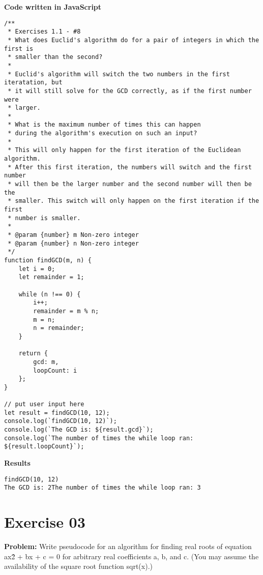 \documentclass[paper=a4, fontsize=11pt]{scrartcl} %
\numberwithin{equation}{section} %
\numberwithin{figure}{section} %
\numberwithin{table}{section} %
\begin{document}
\bigskip
\textbf{Code written in JavaScript}
\begin{lstlisting}
/**
 * Exercises 1.1 - #8
 * What does Euclid's algorithm do for a pair of integers in which the first is
 * smaller than the second? 
 * 
 * Euclid's algorithm will switch the two numbers in the first iteratation, but
 * it will still solve for the GCD correctly, as if the first number were
 * larger.
 * 
 * What is the maximum number of times this can happen
 * during the algorithm's execution on such an input?
 * 
 * This will only happen for the first iteration of the Euclidean algorithm. 
 * After this first iteration, the numbers will switch and the first number
 * will then be the larger number and the second number will then be the
 * smaller. This switch will only happen on the first iteration if the first 
 * number is smaller.
 * 
 * @param {number} m Non-zero integer
 * @param {number} n Non-zero integer
 */
function findGCD(m, n) {
    let i = 0;
    let remainder = 1;

    while (n !== 0) {
        i++;
        remainder = m % n;
        m = n;
        n = remainder;
    }
    
    return { 
        gcd: m, 
        loopCount: i
    };
}

// put user input here
let result = findGCD(10, 12);
console.log(`findGCD(10, 12)`);
console.log(`The GCD is: ${result.gcd}`);
console.log(`The number of times the while loop ran: ${result.loopCount}`);
\end{lstlisting}

\bigskip
\textbf{Results}
\begin{lstlisting}
findGCD(10, 12)
The GCD is: 2The number of times the while loop ran: 3
\end{lstlisting}


\section{Exercise 03}

\textbf{Problem:} Write pseudocode for an algorithm for finding real roots of equation ax\^2 + bx + c = 0 for arbitrary real coefficients a, b, and c. (You may assume the availability of the square root function sqrt(x).)
\end{document}
